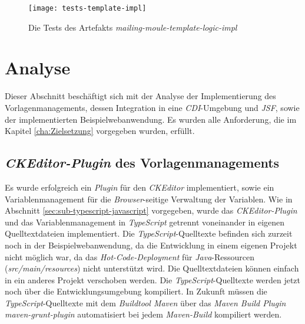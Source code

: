 \begin{figure}[h]
\centering
\texttt{[image: tests-template-impl]}
\caption{Die Tests des Artefakts \emph{mailing-moule-template-logic-impl}}
\label{fig:tests-template-impl}
\end{figure}

\section{Analyse}
Dieser Abschnitt beschäftigt sich mit der Analyse der Implementierung des Vorlagenmanagements, dessen Integration in eine \emph{CDI}-Umgebung und \emph{JSF}, sowie der implementierten Beispielwebanwendung. Es wurden alle Anforderung, die im Kapitel \ref{cha:Zielsetzung} vorgegeben wurden, erfüllt.

\subsection{\emph{CKEditor-Plugin} des Vorlagenmanagements}
Es wurde erfolgreich ein \emph{Plugin} für den \emph{CKEditor} implementiert, sowie ein Variablenmanagement für die \emph{Browser}-seitige Verwaltung der Variablen. Wie in Abschnitt \ref{sec:sub-typescript-javascript} vorgegeben, wurde das \emph{CKEditor-Plugin} und das Variablenmanagement in \emph{TypeScript} getrennt voneinander in eigenen Quelltextdateien implementiert. Die \emph{TypeScript}-Quelltexte befinden sich zurzeit noch in der Beispielwebanwendung, da die Entwicklung in einem eigenen Projekt nicht möglich war, da das \emph{Hot-Code-Deployment} für \emph{Java}-Ressourcen (\emph{src/main/resources}) nicht unterstützt wird. Die Quelltextdateien können einfach in ein anderes Projekt verschoben werden. Die \emph{TypeScript}-Quelltexte werden jetzt noch über die Entwicklungsumgebung kompiliert. In Zukunft müssen die \emph{TypeScript}-Quelltexte mit dem \emph{Buildtool Maven} über das \emph{Maven Build Plugin maven-grunt-plugin} automatisiert bei jedem \emph{Maven-Build} kompiliert werden.

